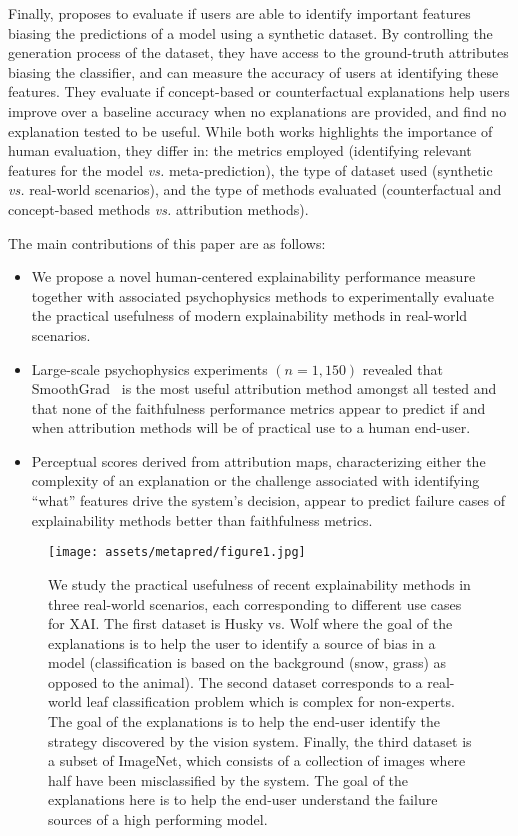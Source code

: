 Finally, \cite{sixt2022users} proposes to evaluate if users are able to identify important features biasing the predictions of a model using a synthetic dataset. By controlling the generation process of the dataset, they have access to the ground-truth attributes biasing the classifier, and can measure the accuracy of users at identifying these features. They evaluate if concept-based or counterfactual explanations help users improve over a baseline accuracy when no explanations are provided, and find no explanation tested to be useful. While both works highlights the importance of human evaluation, they differ in: the metrics employed (identifying relevant features for the model \textit{vs.} meta-prediction), the type of dataset used (synthetic \textit{vs.} real-world scenarios), and the type of methods evaluated (counterfactual and concept-based methods \textit{vs.} attribution methods). 


The main contributions of this paper are as follows:
\begin{itemize}[leftmargin=*]
    \item We propose a novel human-centered explainability performance measure together with associated psychophysics methods to experimentally evaluate the practical usefulness of modern explainability methods in real-world scenarios.
    \item Large-scale psychophysics experiments $(n=1,150)$ revealed that SmoothGrad~\cite{smilkov2017smoothgrad} is the most useful attribution method amongst all tested and that none of the faithfulness performance metrics appear to predict if and when attribution methods will be of practical use to a human end-user. 
    \item Perceptual scores derived from attribution maps, characterizing either the complexity of an explanation or the challenge associated with identifying ``what'' features drive the system's decision, appear to predict failure cases of explainability methods better than faithfulness metrics.
\end{itemize}

\begin{figure}[t!] %
  \centerline{\texttt{[image: assets/metapred/figure1.jpg]}}
  \caption{
  We study the practical usefulness of recent explainability methods in three real-world scenarios, each corresponding to different use cases for XAI. 
  The first dataset is Husky vs. Wolf where the goal of the explanations is to help the user to identify a source of bias in a model (classification is based on the background (snow, grass) as opposed to the animal). 
  The second dataset corresponds to a real-world leaf classification problem which is complex for non-experts. The goal of the explanations is to help the end-user identify the strategy discovered by the vision system. 
  Finally, the third dataset is a subset of ImageNet, which consists of a collection of images where half have been misclassified by the system. The goal of the explanations here is to help the end-user understand the failure sources of a high performing model.   
  }
  \label{fig:metapred:big_picture}
\end{figure}


